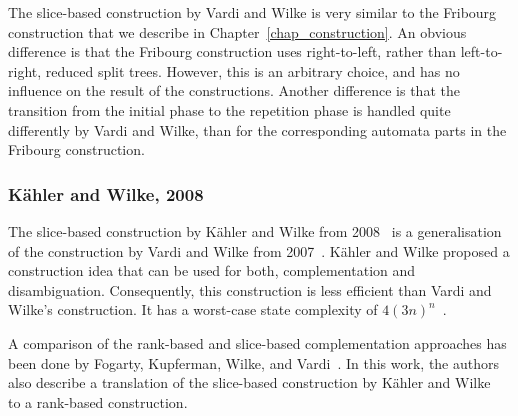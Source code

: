 The slice-based construction by Vardi and Wilke is very similar to the Fribourg construction that we describe in Chapter~\ref{chap_construction}. An obvious difference is that the Fribourg construction uses right-to-left, rather than left-to-right, reduced split trees. However, this is an arbitrary choice, and has no influence on the result of the constructions. Another difference is that the transition from the initial phase to the repetition phase is handled quite differently by Vardi and Wilke, than for the corresponding automata parts in the Fribourg construction.

\subsubsection{Kähler and Wilke, 2008}
The slice-based construction by Kähler and Wilke from 2008~\cite{2008_kaehler} is a generalisation of the construction by Vardi and Wilke from 2007~\cite{vardi2007automata}. Kähler and Wilke proposed a construction idea that can be used for both, complementation and disambiguation. Consequently, this construction is less efficient than Vardi and Wilke's construction. It has a worst-case state complexity of $4(3n)^n$~\cite{2011_tsai}.

A comparison of the rank-based and slice-based complementation approaches has been done by Fogarty, Kupferman, Wilke, and Vardi~\cite{fogarty2013unifying}. In this work, the authors also describe a translation of the slice-based construction by Kähler and Wilke~\cite{2008_kaehler} to a rank-based construction.









